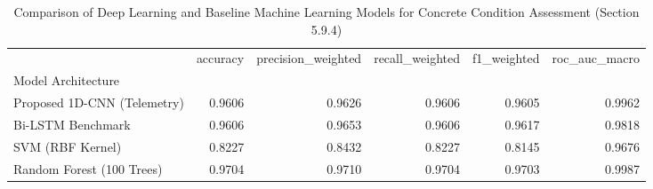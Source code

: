\begin{table}
\caption{Comparison of Deep Learning and Baseline Machine Learning Models for Concrete Condition Assessment (Section 5.9.4)}
\label{tab:benchmark_models}
\begin{tabular}{lrrrrr}
\toprule
 & accuracy & precision_weighted & recall_weighted & f1_weighted & roc_auc_macro \\
Model Architecture &  &  &  &  &  \\
\midrule
Proposed 1D-CNN (Telemetry) & 0.9606 & 0.9626 & 0.9606 & 0.9605 & 0.9962 \\
Bi-LSTM Benchmark & 0.9606 & 0.9653 & 0.9606 & 0.9617 & 0.9818 \\
SVM (RBF Kernel) & 0.8227 & 0.8432 & 0.8227 & 0.8145 & 0.9676 \\
Random Forest (100 Trees) & 0.9704 & 0.9710 & 0.9704 & 0.9703 & 0.9987 \\
\bottomrule
\end{tabular}
\end{table}
